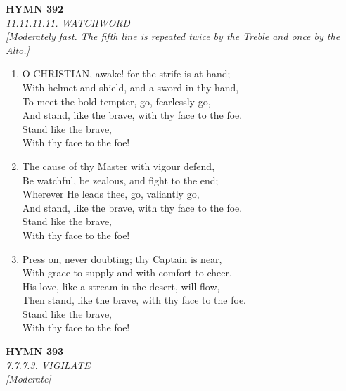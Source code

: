 \documentclass[11pt,a4paper]{article}
\begin{document}
\newpage
\begin{center}
    {\Large \textbf{HYMN 392}}
    \\
    \textit{11.11.11.11. WATCHWORD}
    \\
    \textit{\small [Moderately fast. The fifth line is repeated twice by the Treble and once by the Alto.]}
\end{center}
\vspace{1em}

\begin{enumerate}
    \item O CHRISTIAN, awake! for the strife is at hand; \\
        With helmet and shield, and a sword in thy hand, \\
        To meet the bold tempter, go, fearlessly go, \\
        And stand, like the brave, with thy face to the foe. \\
        Stand like the brave, \\
        With thy face to the foe!

    \item The cause of thy Master with vigour defend, \\
        Be watchful, be zealous, and fight to the end; \\
        Wherever He leads thee, go, valiantly go, \\
        And stand, like the brave, with thy face to the foe. \\
        Stand like the brave, \\
        With thy face to the foe!

    \item Press on, never doubting; thy Captain is near, \\
        With grace to supply and with comfort to cheer. \\
        His love, like a stream in the desert, will flow, \\
        Then stand, like the brave, with thy face to the foe. \\
        Stand like the brave, \\
        With thy face to the foe!

\end{enumerate}

\newpage
\begin{center}
    {\Large \textbf{HYMN 393}}
    \\
    \textit{7.7.7.3. VIGILATE}
    \\
    \textit{\small [Moderate]}
\end{center}
\vspace{1em}
\end{document}
